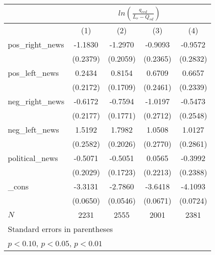 {
\begin{tabular}{l*{4}{c}}
\hline
&\multicolumn{4}{c}{$   ln\left( \frac{q_{crd}}{L_{r}-Q_{rd}}  \right)$}\\
\hline
          &\multicolumn{1}{c}{(1)}&\multicolumn{1}{c}{(2)}&\multicolumn{1}{c}{(3)}&\multicolumn{1}{c}{(4)}\\
          \hline
\hline
pos\_right\_news&  -1.1830\sym{***}&  -1.2970\sym{***}&  -0.9093\sym{***}&  -0.9572\sym{***}\\
          & (0.2379)         & (0.2059)         & (0.2365)         & (0.2832)         \\
pos\_left\_news&   0.2434         &   0.8154\sym{***}&   0.6709\sym{***}&   0.6657\sym{***}\\
          & (0.2172)         & (0.1709)         & (0.2461)         & (0.2339)         \\
neg\_right\_news&  -0.6172\sym{***}&  -0.7594\sym{***}&  -1.0197\sym{***}&  -0.5473\sym{**} \\
          & (0.2177)         & (0.1771)         & (0.2712)         & (0.2548)         \\
neg\_left\_news&   1.5192\sym{***}&   1.7982\sym{***}&   1.0508\sym{***}&   1.0127\sym{***}\\
          & (0.2582)         & (0.2026)         & (0.2770)         & (0.2861)         \\
political\_news&  -0.5071\sym{**} &  -0.5051\sym{***}&   0.0565         &  -0.3992\sym{*}  \\
          & (0.2029)         & (0.1723)         & (0.2213)         & (0.2388)         \\
\_cons     &  -3.3131\sym{***}&  -2.7860\sym{***}&  -3.6418\sym{***}&  -4.1093\sym{***}\\
          & (0.0650)         & (0.0546)         & (0.0671)         & (0.0724)         \\
\hline
\(N\)     &     2231         &     2555         &     2001         &     2381         \\
\hline\hline
\multicolumn{5}{l}{\footnotesize Standard errors in parentheses}\\
\multicolumn{5}{l}{\footnotesize \sym{*} \(p<0.10\), \sym{**} \(p<0.05\), \sym{***} \(p<0.01\)}\\
\end{tabular}
}
